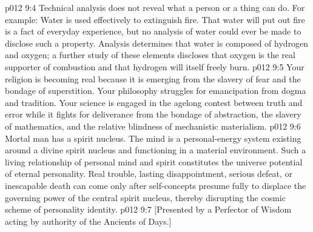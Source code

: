 \vs p012 9:4 Technical analysis does not reveal what a person or a thing can do. For example: Water is used effectively to extinguish fire. That water will put out fire is a fact of everyday experience, but no analysis of water could ever be made to disclose such a property. Analysis determines that water is composed of hydrogen and oxygen; a further study of these elements discloses that oxygen is the real supporter of combustion and that hydrogen will itself freely burn.
\vs p012 9:5 Your religion is becoming real because it is emerging from the slavery of fear and the bondage of superstition. Your philosophy struggles for emancipation from dogma and tradition. Your science is engaged in the agelong contest between truth and error while it fights for deliverance from the bondage of abstraction, the slavery of mathematics, and the relative blindness of mechanistic materialism.
\pc \vs p012 9:6 Mortal man has a spirit nucleus. The mind is a personal\hyp{}energy system existing around a divine spirit nucleus and functioning in a material environment. Such a living relationship of personal mind and spirit constitutes the universe potential of eternal personality. Real trouble, lasting disappointment, serious defeat, or inescapable death can come only after self\hyp{}concepts presume fully to displace the governing power of the central spirit nucleus, thereby disrupting the cosmic scheme of personality identity.
\vsetoff
\vs p012 9:7 [Presented by a Perfector of Wisdom acting by authority of the Ancients of Days.]
